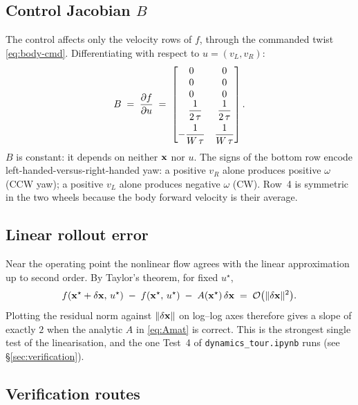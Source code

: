 \subsection{Control Jacobian \texorpdfstring{$B$}{B}}

The control affects only the velocity rows of $f$, through the commanded twist \eqref{eq:body-cmd}. Differentiating with respect to $u = (v_L, v_R)$:
\begin{equation}
    B \;=\; \frac{\partial f}{\partial u} \;=\;
    \begin{bmatrix}
        0 & 0 \\
        0 & 0 \\
        0 & 0 \\
        \phantom{-}\dfrac{1}{2\,\tau} & \dfrac{1}{2\,\tau} \\[8pt]
        -\dfrac{1}{W\,\tau} & \dfrac{1}{W\,\tau}
    \end{bmatrix}.
    \label{eq:Bmat}
\end{equation}
$B$ is constant: it depends on neither $\mathbf{x}$ nor $u$. The signs of the bottom row encode left-handed-versus-right-handed yaw: a positive $v_R$ alone produces positive $\omega$ (CCW yaw); a positive $v_L$ alone produces negative $\omega$ (CW). Row~4 is symmetric in the two wheels because the body forward velocity is their average.

\subsection{Linear rollout error}

Near the operating point the nonlinear flow agrees with the linear approximation up to second order. By Taylor's theorem, for fixed $u^{\star}$,
\begin{equation}
    f(\mathbf{x}^{\star} + \delta\mathbf{x},\, u^{\star})
    \;-\; f(\mathbf{x}^{\star},\, u^{\star})
    \;-\; A(\mathbf{x}^{\star})\,\delta\mathbf{x}
    \;=\; \mathcal{O}\bigl(\|\delta\mathbf{x}\|^{2}\bigr).
    \label{eq:lin-residual}
\end{equation}
Plotting the residual norm against $\|\delta\mathbf{x}\|$ on log--log axes therefore gives a slope of exactly $2$ when the analytic $A$ in \eqref{eq:Amat} is correct. This is the strongest single test of the linearisation, and the one Test~4 of \texttt{dynamics\_tour.ipynb} runs (see \S\ref{sec:verification}).

\subsection{Verification routes}

